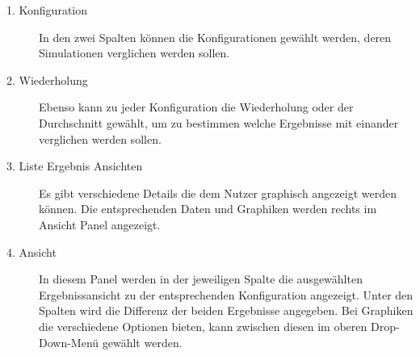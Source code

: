 \begin{description}

\item[1. Konfiguration] In den zwei Spalten können die Konfigurationen gewählt werden, deren Simulationen verglichen werden sollen.

\item[2. Wiederholung] Ebenso kann zu jeder Konfiguration die Wiederholung oder der Durchschnitt gewählt, um zu bestimmen welche Ergebnisse mit einander verglichen werden sollen.

\item[3. Liste Ergebnis Ansichten] Es gibt verschiedene Details die dem Nutzer graphisch angezeigt werden können. Die entsprechenden Daten und Graphiken werden rechts im Ansicht Panel angezeigt.


\item[4. Ansicht] In diesem Panel werden in der jeweiligen Spalte die ausgewählten Ergebnissansicht zu der entsprechenden Konfiguration angezeigt. Unter den Spalten wird die Differenz der beiden Ergebnisse angegeben. Bei Graphiken die verschiedene Optionen bieten, kann zwischen diesen im oberen Drop-Down-Menü gewählt werden.

\end{description}



